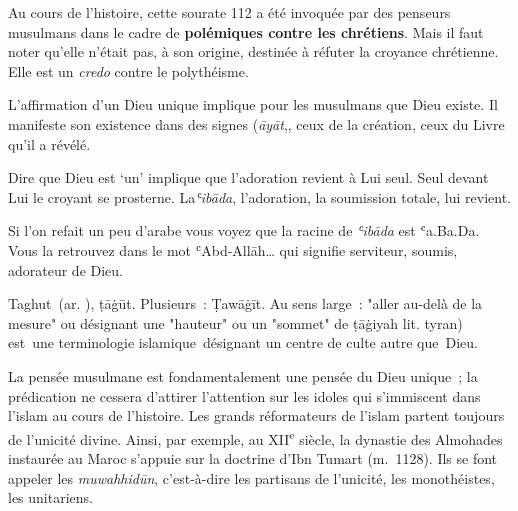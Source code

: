 Au cours de l'histoire, cette sourate 112 a été invoquée par des
penseurs musulmans dans le cadre de \textbf{polémiques contre les
chrétiens}. Mais il faut noter qu'elle n'était pas, à son origine,
destinée à réfuter la croyance chrétienne. Elle est un \emph{credo}
contre le polythéisme.

L'affirmation d'un Dieu unique implique pour les musulmans que Dieu
existe. Il manifeste son existence dans des signes (\emph{āyāt},,
ceux de la création, ceux du Livre qu'il a révélé.

Dire que Dieu est `un' implique que l'adoration revient à Lui seul. Seul
devant Lui le croyant se prosterne. La\emph{ʿibāda}, l'adoration, la
soumission totale, lui revient.

Si l'on refait un peu d'arabe vous voyez que la racine de \emph{ʿibāda}
est ʿa.Ba.Da. Vous la retrouvez dans le mot ʿAbd-Allāh\ldots{} qui
signifie serviteur, soumis, adorateur de Dieu.


\begin{Def}[Taghut]
{Taghut~(ar.  ), ṭāġūt. Plusieurs~: Ṭawāġīt. Au sens large~: "aller au-delà de la mesure" ou désignant une "hauteur" ou un "sommet" de ṭāġiyah  lit. tyran) est~une terminologie islamique~désignant un centre de culte autre que~Dieu.}
\end{Def}

La pensée musulmane est fondamentalement une pensée du Dieu unique~; la
prédication ne cessera d'attirer l'attention sur les idoles qui
s'immiscent dans l'islam au cours de l'histoire. Les grands réformateurs
de l'islam partent toujours de l'unicité divine. Ainsi, par exemple, au
XII\textsuperscript{e} siècle, la dynastie des Almohades instaurée au
Maroc s'appuie sur la doctrine d'Ibn Tumart (m.~1128). Ils se font
appeler les \emph{muwahhidūn}, c'est-à-dire les partisans de l'unicité,
les monothéistes, les unitariens.





